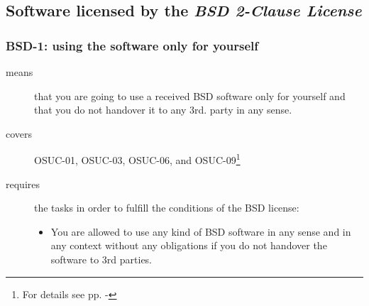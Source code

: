 \begin{center}
\begin{footnotesize}
{{{{{{           
        }


      }
 
    }
   }   

  }
}
\end{footnotesize}
\end{center}

\subsection{Software licensed by the \emph{BSD 2-Clause License}}

\subsubsection{BSD-1: using the software only for yourself}
\label{OSUC-01-BSD} 
\label{OSUC-03-BSD} 
\label{OSUC-06-BSD}
\label{OSUC-09-BSD}
  
\begin{description}
\item[means] that you are going to use a received BSD software only for yourself
and that you do not handover it to any 3rd. party in any sense.
\item[covers] OSUC-01, OSUC-03, OSUC-06, and OSUC-09\footnote{For details see pp.
  \pageref{OSUC-01-DEF} - \pageref{OSUC-09-DEF}}
\item[requires] the tasks in order to fulfill the conditions
    of the BSD license:
  \begin{itemize}
    \item You are allowed to use any kind of BSD software in any sense and in
    any context without any obligations if you do not handover the software to
    3rd parties.
  \end{itemize}
\end{description}



